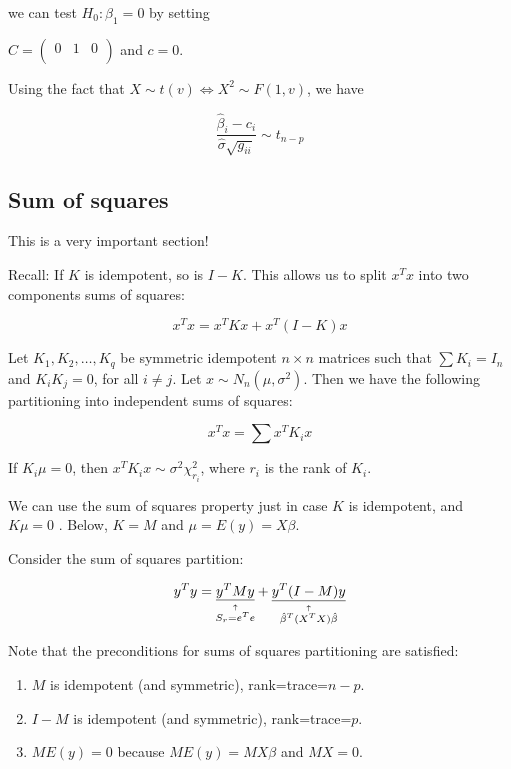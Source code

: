 \noindent
we can test $H_0: \beta_1=0$ by setting 

$C=\begin{pmatrix} 
0 & 1 & 0\\
\end{pmatrix}$
and $c=0$.


Using the fact that $X\sim t(v)\Leftrightarrow X^2 \sim F(1,v)$, we have


\begin{equation}
\frac{\hat{\beta}_i - c_i}{\hat{\sigma}\sqrt{g_{ii}}} \sim t_{n-p}
\end{equation}
 
\subsection{Sum of squares}

This is a very important section!

\begin{fmpage}{\linewidth}

Recall:
If $K$ is idempotent, so is $I-K$. This allows us to split $x^T x$ into two components sums of squares:

\begin{equation}
x^T x = x^T K x+x^T (I-K) x
\end{equation}

 Let $K_1, K_2,\dots, K_q$ be symmetric idempotent $n \times n$ matrices such that
 $\sum K_i= I_n$ and $K_iK_j =0$, for all $i\neq j $. Let $x\sim N_n(\mu, \sigma^2)$.
 Then we have the following partitioning into independent sums of squares:
 
  \begin{equation}
x^T x = \sum x^T K_i x
\end{equation}

If $K_i \mu = 0$, then $ x^T K_i x\sim \sigma^2 \chi_{r_i}^2$, where $r_i$ is the rank of $K_i$.
\end{fmpage}

We can use the sum of squares property just in case $K$ is idempotent, and $K\mu =0$ . Below, $K=M$ and $\mu=E(y)=X\beta$.

Consider the sum of squares partition:

\begin{equation}
y^T y = \explain{\underline{y^T M y}}{S_r= e^T e} + \explain{\underline{y^T (I-M) y}}{\hat{\beta}^T (X^T X)\hat{\beta}}
\end{equation}

Note that the preconditions for sums of squares partitioning are satisfied:
\begin{enumerate}
\item $M$ is idempotent  (and symmetric), rank=trace=$n-p$.
\item $I-M$ is idempotent (and symmetric), rank=trace=$p$.
\item $ME(y) = 0$ because $ME(y)=MX\beta$ and $MX=0$.
\end{enumerate}

